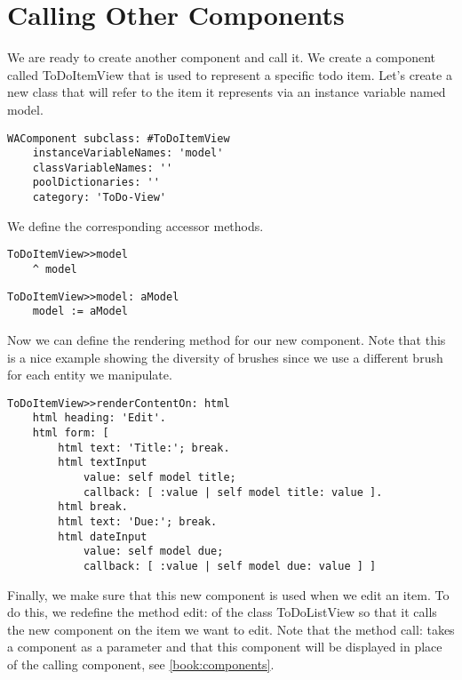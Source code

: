 \documentclass[a4paper,10pt,twoside]{book}
\newcommand{\ct}[1]{{\small\ttfamily\textup{#1}}}
\begin{document}
\section{Calling Other Components}
\label{book:inaction:todo:callothercomponents}

We are ready to create another component and call it. We create a component called \ct{ToDoItemView} that is used to represent a specific todo item. Let's create a new class that will refer to the item it represents via an instance variable named \ct{model}.

\begin{lstlisting}
WAComponent subclass: #ToDoItemView
    instanceVariableNames: 'model'
    classVariableNames: ''
    poolDictionaries: ''
    category: 'ToDo-View'
\end{lstlisting}

We define the corresponding accessor methods.

\begin{lstlisting}
ToDoItemView>>model
    ^ model
\end{lstlisting}

\begin{lstlisting}
ToDoItemView>>model: aModel
    model := aModel
\end{lstlisting}

Now we can define the rendering method for our new component. Note that this is a nice example showing the diversity of brushes since we use a different brush for each entity we manipulate.

\begin{lstlisting}
ToDoItemView>>renderContentOn: html
    html heading: 'Edit'.
    html form: [
        html text: 'Title:'; break.
        html textInput
            value: self model title;
            callback: [ :value | self model title: value ].
        html break.
        html text: 'Due:'; break.
        html dateInput
            value: self model due;
            callback: [ :value | self model due: value ] ]
\end{lstlisting}

Finally, we make sure that this new component is used when we edit an item. To do this, we redefine the method \ct{edit:} of the class \ct{ToDoListView} so that it calls the new component on the item we want to edit. Note that the method \ct{call:} takes a component as a parameter and that this component will be displayed in place of the calling component, see \autoref{book:components}.
\end{document}
